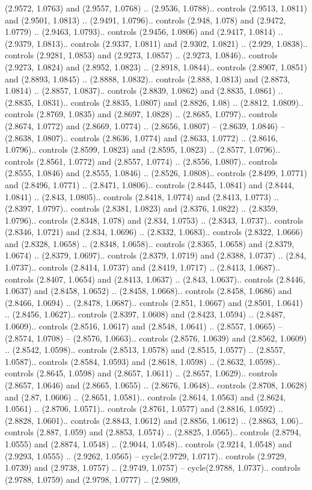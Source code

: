 (2.9572, 1.0763) and (2.9557, 1.0768) .. (2.9536, 1.0788).. controls (2.9513, 1.0811) and (2.9501, 1.0813) .. (2.9491, 1.0796).. controls (2.948, 1.078) and (2.9472, 1.0779) .. (2.9463, 1.0793).. controls (2.9456, 1.0806) and (2.9417, 1.0814) .. (2.9379, 1.0813).. controls (2.9337, 1.0811) and (2.9302, 1.0821) .. (2.929, 1.0838).. controls (2.9281, 1.0853) and (2.9273, 1.0857) .. (2.9273, 1.0846).. controls (2.9273, 1.0824) and (2.8952, 1.0823) .. (2.8918, 1.0844).. controls (2.8907, 1.0851) and (2.8893, 1.0845) .. (2.8888, 1.0832).. controls (2.888, 1.0813) and (2.8873, 1.0814) .. (2.8857, 1.0837).. controls (2.8839, 1.0862) and (2.8835, 1.0861) .. (2.8835, 1.0831).. controls (2.8835, 1.0807) and (2.8826, 1.08) .. (2.8812, 1.0809).. controls (2.8769, 1.0835) and (2.8697, 1.0828) .. (2.8685, 1.0797).. controls (2.8674, 1.0772) and (2.8669, 1.0774) .. (2.8656, 1.0807) -- (2.8639, 1.0846) -- (2.8638, 1.0807).. controls (2.8636, 1.0774) and (2.8633, 1.0772) .. (2.8616, 1.0796).. controls (2.8599, 1.0823) and (2.8595, 1.0823) .. (2.8577, 1.0796).. controls (2.8561, 1.0772) and (2.8557, 1.0774) .. (2.8556, 1.0807).. controls (2.8555, 1.0846) and (2.8555, 1.0846) .. (2.8526, 1.0808).. controls (2.8499, 1.0771) and (2.8496, 1.0771) .. (2.8471, 1.0806).. controls (2.8445, 1.0841) and (2.8444, 1.0841) .. (2.843, 1.0805).. controls (2.8418, 1.0774) and (2.8413, 1.0773) .. (2.8397, 1.0797).. controls (2.8381, 1.0823) and (2.8376, 1.0822) .. (2.8359, 1.0796).. controls (2.8348, 1.078) and (2.834, 1.0753) .. (2.8343, 1.0737).. controls (2.8346, 1.0721) and (2.834, 1.0696) .. (2.8332, 1.0683).. controls (2.8322, 1.0666) and (2.8328, 1.0658) .. (2.8348, 1.0658).. controls (2.8365, 1.0658) and (2.8379, 1.0674) .. (2.8379, 1.0697).. controls (2.8379, 1.0719) and (2.8388, 1.0737) .. (2.84, 1.0737).. controls (2.8414, 1.0737) and (2.8419, 1.0717) .. (2.8413, 1.0687).. controls (2.8407, 1.0654) and (2.8413, 1.0637) .. (2.843, 1.0637).. controls (2.8446, 1.0637) and (2.8458, 1.0652) .. (2.8458, 1.0668).. controls (2.8458, 1.0686) and (2.8466, 1.0694) .. (2.8478, 1.0687).. controls (2.851, 1.0667) and (2.8501, 1.0641) .. (2.8456, 1.0627).. controls (2.8397, 1.0608) and (2.8423, 1.0594) .. (2.8487, 1.0609).. controls (2.8516, 1.0617) and (2.8548, 1.0641) .. (2.8557, 1.0665) -- (2.8574, 1.0708) -- (2.8576, 1.0663).. controls (2.8576, 1.0639) and (2.8562, 1.0609) .. (2.8542, 1.0598).. controls (2.8513, 1.0578) and (2.8515, 1.0577) .. (2.8557, 1.0587).. controls (2.8584, 1.0593) and (2.8618, 1.0598) .. (2.8632, 1.0598).. controls (2.8645, 1.0598) and (2.8657, 1.0611) .. (2.8657, 1.0629).. controls (2.8657, 1.0646) and (2.8665, 1.0655) .. (2.8676, 1.0648).. controls (2.8708, 1.0628) and (2.87, 1.0606) .. (2.8651, 1.0581).. controls (2.8614, 1.0563) and (2.8624, 1.0561) .. (2.8706, 1.0571).. controls (2.8761, 1.0577) and (2.8816, 1.0592) .. (2.8828, 1.0601).. controls (2.8843, 1.0612) and (2.8856, 1.0612) .. (2.8863, 1.06).. controls (2.887, 1.059) and (2.8853, 1.0574) .. (2.8825, 1.0565).. controls (2.8794, 1.0555) and (2.8874, 1.0548) .. (2.9044, 1.0548).. controls (2.9214, 1.0548) and (2.9293, 1.0555) .. (2.9262, 1.0565) -- cycle(2.9729, 1.0717).. controls (2.9729, 1.0739) and (2.9738, 1.0757) .. (2.9749, 1.0757) -- cycle(2.9788, 1.0737).. controls (2.9788, 1.0759) and (2.9798, 1.0777) .. (2.9809, 